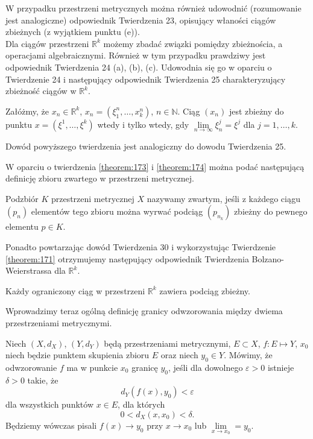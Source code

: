 \documentclass[leqno]{article}
\begin{document}
\begin{justify}
W przypadku przestrzeni metrycznych można również udowodnić (rozumowanie jest analogiczne) odpowiednik Twierdzenia 23, opisujący właności ciągów zbieżnych (z wyjątkiem punktu (e)). \\
Dla ciągów przestrzeni $\mathbb{R}^k$ możemy zbadać związki pomiędzy zbieżnościa, a operacjami algebraicznymi.
Również w tym przypadku prawdziwy jest odpowiednik Twierdzenia 24 (a), (b), (c). Udowodnia się go w oparciu o Twierdzenie 24 
i następujący odpowiednik Twierdzenia 25 charakteryzujący zbieżność ciągów w $\mathbb{R}^k$.

\begin{theorem}
{
    Załóżmy, że $x_n \in \mathbb{R}^k$, $x_n = (\xi_1^n, \ldots, x_k^n)$, $n \in \mathbb{N}$.
    Ciąg $(x_n)$ jest zbieżny do punktu $x = (\xi^1, \ldots, \xi^k)$ wtedy i tylko wtedy, gdy
    $\lim\limits_{n \to \infty} \xi_n^j = \xi^j$ dla $j = 1, \ldots, k$.
}
\end{theorem}

Dowód powyższego twierdzenia jest analogiczny do dowodu Twierdzenia 25.

W oparciu o twierdzenia \ref{theorem:173} i \ref{theorem:174} można podać następującą definicję zbioru zwartego w
przestrzeni metrycznej.

\begin{defn}
    Podzbiór $K$ przestrzeni metrycznej $X$ nazywamy zwartym, jeśli z każdego ciągu $(p_n)$ elementów tego zbioru
    można wyrwać podciąg $(p_{n_k})$ zbieżny do pewnego elementu $p \in K$.
\end{defn}

Ponadto powtarzając dowód Twierdzenia 30 i wykorzystując Twierdzenie \ref{theorem:171} otrzymujemy
następujący odpowiednik Twierdzenia Bolzano-Weierstrassa dla $\mathbb{R}^k$.

\begin{theorem}
{
    Każdy ograniczony ciąg w przestrzeni $\mathbb{R}^k$ zawiera podciąg zbieżny. 
}
\end{theorem}

Wprowadzimy teraz ogólną definicję granicy odwzorowania między dwiema przestrzeniami metrycznymi.

\begin{defn}
    Niech $(X, d_X)$, $(Y, d_Y)$ będą przestrzeniami metrycznymi, $E \subset X$, $f : E \mapsto Y$, $x_0$ niech będzie punktem skupienia zbioru $E$
    oraz niech $y_0 \in Y$. Mówimy, że odwzorowanie $f$ ma w punkcie $x_0$ granicę $y_0$, jeśli dla dowolnego $\varepsilon > 0$ istnieje $\delta > 0$ takie, że
    \[
        d_Y(f(x), y_0) < \varepsilon
    \]
    dla wszystkich punktów $x \in E$, dla których
    \[
        0 < d_X(x, x_0) < \delta.
    \]
    Będziemy wówczas pisali $f(x) \to y_0$ przy $x \to x_0$ lub $\lim\limits_{x \to x_0} = y_0$.
\end{defn}


\end{justify}
\end{document}
